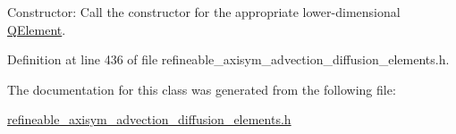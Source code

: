 Constructor\+: Call the constructor for the appropriate lower-\/dimensional \hyperlink{classoomph_1_1QElement}{Q\+Element}. 



Definition at line 436 of file refineable\+\_\+axisym\+\_\+advection\+\_\+diffusion\+\_\+elements.\+h.



The documentation for this class was generated from the following file\+:\begin{DoxyCompactItemize}
\item 
\hyperlink{refineable__axisym__advection__diffusion__elements_8h}{refineable\+\_\+axisym\+\_\+advection\+\_\+diffusion\+\_\+elements.\+h}\end{DoxyCompactItemize}
